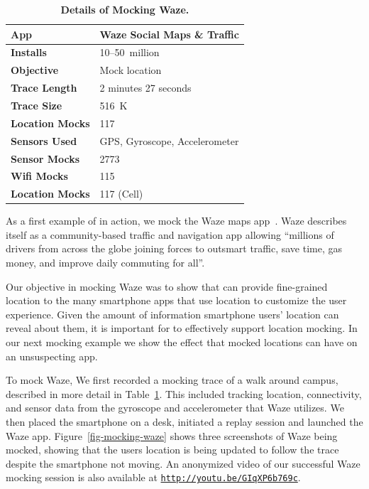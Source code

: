 \begin{table}
{\small
\begin{tabularx}{0.6\textwidth}{lX}
\textbf{App} & Waze Social Maps \& Traffic \\ \toprule
\textbf{Installs} & 10--50~million \\
\textbf{Objective} & Mock location \\ \midrule
\textbf{Trace Length} & 2 minutes 27 seconds \\
\textbf{Trace Size} & 516~K \\
\textbf{Location Mocks} & 117 \\
\textbf{Sensors Used} & {\small GPS, Gyroscope, Accelerometer} \\
\textbf{Sensor Mocks} & 2773 \\
\textbf{Wifi Mocks} & 115 \\
\textbf{Location Mocks} & 117 (Cell) \\
\end{tabularx}

\caption{\textbf{Details of Mocking Waze.}}

\label{table-mocking-waze}
}
\vspace*{-0.1in}
\end{table}

As a first example of \PocketMocker{} in action, we mock the Waze maps
app~\cite{waze-playstore-url}. Waze describes itself as a community-based
traffic and navigation app allowing ``millions of drivers from across the
globe joining forces to outsmart traffic, save time, gas money, and improve
daily commuting for all''.

Our objective in mocking Waze was to show that \PocketMocker{} can provide
fine-grained location to the many smartphone apps that use location to
customize the user experience. Given the amount of information smartphone
users' location can reveal about them, it is important for \PocketMocker{} to
effectively support location mocking. In our next mocking example we show the
effect that mocked locations can have on an unsuspecting app.

To mock Waze, We first recorded a mocking trace of a walk around campus,
described in more detail in Table~\ref{table-mocking-waze}.  This included
tracking location, connectivity, and sensor data from the gyroscope and
accelerometer that Waze utilizes. We then placed the smartphone on a desk,
initiated a replay session and launched the Waze app.
Figure~\ref{fig-mocking-waze} shows three screenshots of Waze being mocked,
showing that the users location is being updated to follow the trace despite
the smartphone not moving. An anonymized video of our successful Waze mocking
session is also available at
\hyperlink{http://youtu.be/GIqXP6b769c}{\texttt{http://youtu.be/GIqXP6b769c}}.

